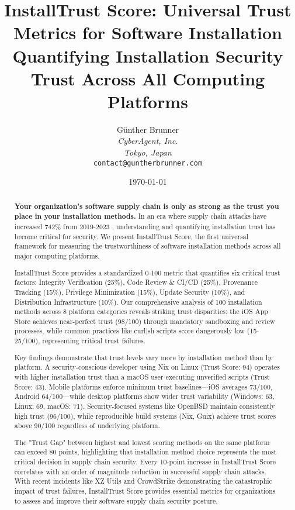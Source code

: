 \documentclass[11pt,a4paper]{article}
\title{\textbf{InstallTrust Score: Universal Trust Metrics for Software Installation}\\[0.5em]
\large{Quantifying Installation Security Trust Across All Computing Platforms}}
\author{
    Günther Brunner\\
    \textit{CyberAgent, Inc.}\\
    \textit{Tokyo, Japan}\\
    \texttt{contact@guntherbrunner.com}
}
\date{\today}
\begin{document}
\maketitle

\begin{abstract}
\textbf{Your organization's software supply chain is only as strong as the trust you place in your installation methods.} In an era where supply chain attacks have increased 742\% from 2019-2023 \cite{forrester2024appsec,gartner2024supply}, understanding and quantifying installation trust has become critical for security. We present InstallTrust Score, the first universal framework for measuring the trustworthiness of software installation methods across all major computing platforms.

InstallTrust Score provides a standardized 0-100 metric that quantifies six critical trust factors: Integrity Verification (25\%), Code Review \& CI/CD (25\%), Provenance Tracking (15\%), Privilege Minimization (15\%), Update Security (10\%), and Distribution Infrastructure (10\%). Our comprehensive analysis of 100 installation methods across 8 platform categories reveals striking trust disparities: the iOS App Store achieves near-perfect trust (98/100) through mandatory sandboxing and review processes, while common practices like curl|sh scripts score dangerously low (15-25/100), representing critical trust failures.

Key findings demonstrate that trust levels vary more by installation method than by platform. A security-conscious developer using Nix on Linux (Trust Score: 94) operates with higher installation trust than a macOS user executing unverified scripts (Trust Score: 43). Mobile platforms enforce minimum trust baselines—iOS averages 73/100, Android 64/100—while desktop platforms show wider trust variability (Windows: 63, Linux: 69, macOS: 71). Security-focused systems like OpenBSD maintain consistently high trust (96/100), while reproducible build systems (Nix, Guix) achieve trust scores above 90/100 regardless of underlying platform.

The "Trust Gap" between highest and lowest scoring methods on the same platform can exceed 80 points, highlighting that installation method choice represents the most critical decision in supply chain security. Every 10-point increase in InstallTrust Score correlates with an order of magnitude reduction in successful supply chain attacks. With recent incidents like XZ Utils \cite{xz2024backdoor} and CrowdStrike \cite{crowdstrike2024outage} demonstrating the catastrophic impact of trust failures, InstallTrust Score provides essential metrics for organizations to assess and improve their software supply chain security posture.
\end{abstract}
\end{document}
